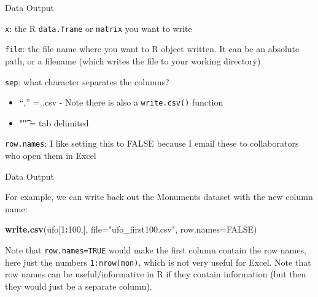 \documentclass[
  ignorenonframetext,
]{beamer}
\newenvironment{Shaded}{\begin{snugshade}}{\end{snugshade}}
\newcommand{\DataTypeTok}[1]{\textcolor[rgb]{0.13,0.29,0.53}{#1}}
\newcommand{\DecValTok}[1]{\textcolor[rgb]{0.00,0.00,0.81}{#1}}
\newcommand{\KeywordTok}[1]{\textcolor[rgb]{0.13,0.29,0.53}{\textbf{#1}}}
\newcommand{\NormalTok}[1]{#1}
\newcommand{\OperatorTok}[1]{\textcolor[rgb]{0.81,0.36,0.00}{\textbf{#1}}}
\newcommand{\OtherTok}[1]{\textcolor[rgb]{0.56,0.35,0.01}{#1}}
\newcommand{\StringTok}[1]{\textcolor[rgb]{0.31,0.60,0.02}{#1}}
\providecommand{\tightlist}{%
  \setlength{\itemsep}{0pt}\setlength{\parskip}{0pt}}
\begin{document}
\begin{frame}[fragile]{Data Output}
\protect\hypertarget{data-output-1}{}

\texttt{x}: the R \texttt{data.frame} or \texttt{matrix} you want to
write

\texttt{file}: the file name where you want to R object written. It can
be an absolute path, or a filename (which writes the file to your
working directory)

\texttt{sep}: what character separates the columns?

\begin{itemize}
\tightlist
\item
  ``,'' = .csv - Note there is also a \texttt{write.csv()} function
\item
  "\t" = tab delimited
\end{itemize}

\texttt{row.names}: I like setting this to FALSE because I email these
to collaborators who open them in Excel

\end{frame}

\begin{frame}[fragile]{Data Output}
\protect\hypertarget{data-output-2}{}

For example, we can write back out the Monuments dataset with the new
column name:

\begin{Shaded}
\begin{Highlighting}[]
\KeywordTok{write.csv}\NormalTok{(ufo[}\DecValTok{1}\OperatorTok{:}\DecValTok{100}\NormalTok{,], }\DataTypeTok{file=}\StringTok{"ufo_first100.csv"}\NormalTok{, }\DataTypeTok{row.names=}\OtherTok{FALSE}\NormalTok{)}
\end{Highlighting}
\end{Shaded}

Note that \texttt{row.names=TRUE} would make the first column contain
the row names, here just the numbers \texttt{1:nrow(mon)}, which is not
very useful for Excel. Note that row names can be useful/informative in
R if they contain information (but then they would just be a separate
column).

\end{frame}
\end{document}
